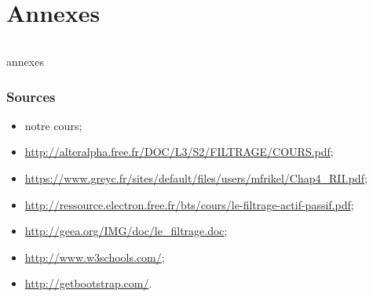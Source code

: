 
\part*{Annexes}
    \paragraph{}
annexes

    \clearpage

    \section*{Sources}
        \begin{itemize}
            \item notre cours;
            \item \url{http://alteralpha.free.fr/DOC/L3/S2/FILTRAGE/COURS.pdf};
            \item \url{https://www.greyc.fr/sites/default/files/users/mfrikel/Chap4_RII.pdf};
            \item \url{http://ressource.electron.free.fr/bts/cours/le-filtrage-actif-passif.pdf};
            \item \url{http://geea.org/IMG/doc/le_filtrage.doc};
            \item \url{http://www.w3schools.com/};
            \item \url{http://getbootstrap.com/}.
        \end{itemize}

